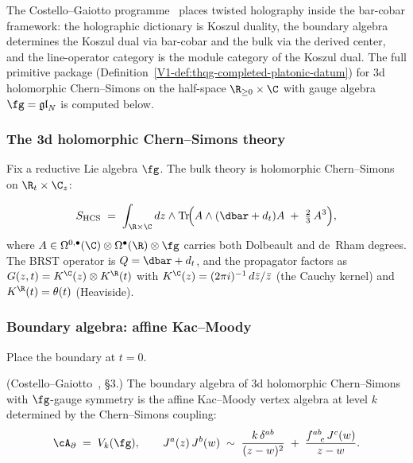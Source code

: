 The Costello--Gaiotto programme~\cite{costello-gaiotto,Gai19}
places twisted holography inside the bar-cobar framework:
the holographic dictionary is Koszul duality,
the boundary algebra determines the Koszul dual via bar-cobar
and the bulk via the derived center,
and the line-operator category is the module category of the Koszul dual.
The full primitive package
(Definition~\ref*{V1-def:thqg-completed-platonic-datum}) for
3d holomorphic Chern--Simons on the half-space
$\R_{\ge 0} \times \C$ with gauge algebra $\fg = \mathfrak{gl}_N$
is computed below.

\subsubsection{The 3d holomorphic Chern--Simons theory}

Fix a reductive Lie algebra $\fg$.
The bulk theory is holomorphic Chern--Simons on $\R_t \times \C_z$:

\begin{equation}\label{eq:tw-hol-hcs-action}
S_{\mathrm{HCS}}
\;=\;
\int_{\R \times \C}
dz \wedge \operatorname{Tr}\!\Bigl(
A \wedge (\dbar + d_t) A
\;+\; \tfrac{2}{3}\, A^3
\Bigr),
\end{equation}
where $A \in \Omega^{0,\bullet}(\C) \otimes \Omega^\bullet(\R) \otimes \fg$
carries both Dolbeault and de~Rham degrees. The BRST operator is
$Q = \dbar + d_t$, and the propagator factors as
$G(z,t) = K^{\C}(z) \otimes K^{\R}(t)$
with $K^{\C}(z) = (2\pi i)^{-1}\, d\bar z / \bar z$ (the Cauchy kernel)
and $K^{\R}(t) = \theta(t)$ (Heaviside).

\subsubsection{Boundary algebra: affine Kac--Moody}

Place the boundary at $t = 0$.

\begin{proposition}
\label{prop:tw-hol-boundary-KM}
\textup{(Costello--Gaiotto~\cite{costello-gaiotto}, \S3.)}
The boundary algebra of 3d holomorphic Chern--Simons with
$\fg$-gauge symmetry is the affine Kac--Moody vertex algebra at
level $k$ determined by the Chern--Simons coupling:
\[
\cA_\partial \;=\; V_k(\fg),
\qquad
J^a(z)\, J^b(w) \;\sim\;
\frac{k\, \delta^{ab}}{(z-w)^2}
\;+\;
\frac{f^{ab}_{\phantom{ab}c}\, J^c(w)}{z-w}.
\]
\end{proposition}

